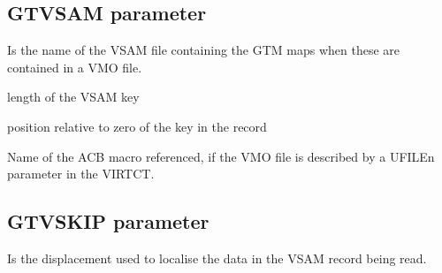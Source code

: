 \documentclass[letterpaper,10pt,english]{sphinxmanual}
\begin{document}
\ignorespaces 

\subsection{GTVSAM parameter}
\label{\detokenize{Installation_Guide:gtvsam-parameter}}\label{\detokenize{Installation_Guide:index-73}}
\begin{sphinxVerbatim}[commandchars=\\\{\}]
       
\end{sphinxVerbatim}

\sphinxAtStartPar
{} \sphinxhyphen{} Is the name of the VSAM file containing the GTM maps when these are contained in a VMO file.

\sphinxAtStartPar
{} \sphinxhyphen{} length of the VSAM key

\sphinxAtStartPar
{} \sphinxhyphen{} position relative to zero of the key in the record

\sphinxAtStartPar
{} \sphinxhyphen{} Name of the ACB macro referenced, if the VMO file is described by a UFILEn parameter in the VIRTCT.

\ignorespaces 

\subsection{GTVSKIP parameter}
\label{\detokenize{Installation_Guide:gtvskip-parameter}}\label{\detokenize{Installation_Guide:index-74}}
\begin{sphinxVerbatim}[commandchars=\\\{\}]
                
\end{sphinxVerbatim}

\sphinxAtStartPar
{} \sphinxhyphen{} Is the displacement used to localise the data in the VSAM record being read.
\end{document}
